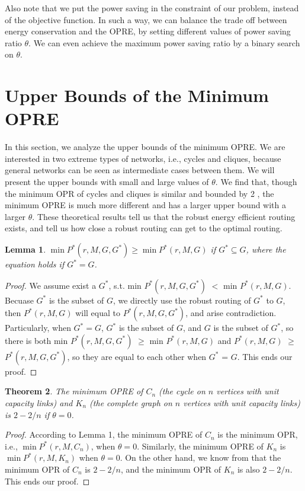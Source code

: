 \documentclass[conference]{IEEEtran}
\newtheorem{theorem}{Theorem}
\newtheorem{lemma}[theorem]{Lemma}
\begin{document}
Also note that we put the power saving in the constraint of our problem, instead of the objective function. In such a way, we can balance the trade off between energy conservation and the OPRE, by setting different values of power saving ratio $\theta$. We can even achieve the maximum power saving ratio by a binary search on $\theta$.

\section{Upper Bounds of the Minimum OPRE}
\label{upper_bounds_of_the_minimum_opre}

In this section, we analyze the upper bounds of the minimum OPRE. We are interested in two extreme types of networks, i.e., cycles and cliques, because general networks can be seen as intermediate cases between them. We will present the upper bounds with small and large values of $\theta$. We find that, though the minimum OPR of cycles and cliques is similar and bounded by 2 \cite{networking:oblivious}, the minimum OPRE is much more different and has a larger upper bound with a larger $\theta$. These theoretical results tell us that the robust energy efficient routing exists, and tell us how close a robust routing can get to the optimal routing.

\begin{lemma}
$\min P^*(r, M, G, G^*) \geq \min P^*(r, M, G)$ if $G^* \subseteq G$, where the equation holds if $G^* = G$.
\end{lemma}
\begin{proof}
We assume exist a $G^*$, s.t. min $P^*(r,M,G,G^*)$ $<$ min $P^*(r, M, G)$. Becuase $G^*$ is the subset of $G$, we directly
use the robust routing of $G^*$ to $G$, then $P^*(r, M, G)$ will equal to $P^*(r,M,G,G^*)$, and arise contradiction.
Particularly, when $G^* = G$, $G^*$ is the subset of $G$, and $G$ is the subset of $G^*$, so there is both
min $P^*(r,M,G,G^*)$ $\geq$ min $P^*(r, M, G)$ and $P^*(r, M ,G)$ $\geq$ $P^*(r, M, G, G^*)$, so they are equal to each other
when $G^*$ = $G$. This ends our proof.
\end{proof}

\begin{theorem}
The minimum OPRE of $C_n$ (the cycle on $n$ vertices with unit capacity links) and $K_n$ (the complete graph on $n$ vertices with unit capacity links) is $2-2/n$ if $\theta = 0$.
\end{theorem}
\begin{proof}
According to Lemma 1, the minimum OPRE of $C_n$ is the minimum OPR, i.e., $\min P^*(r, M, C_n)$, when $\theta = 0$. Similarly, the minimum OPRE of $K_n$ is $\min P^*(r, M, K_n)$ when $\theta = 0$. On the other hand, we know from \cite{networking:oblivious} that the minimum OPR of $C_n$ is $2-2/n$, and the minimum OPR of $K_n$ is also $2-2/n$. This ends our proof.
\end{proof}
\end{document}
